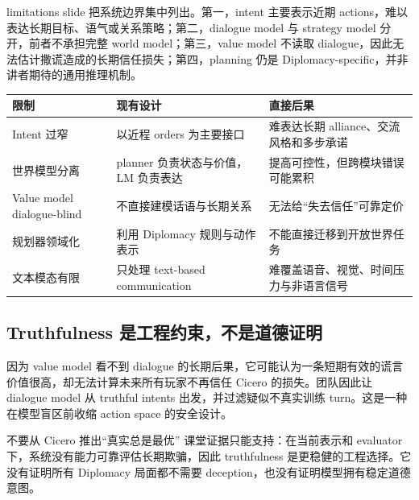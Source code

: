 limitations slide 把系统边界集中列出。第一，intent 主要表示近期 actions，难以表达长期目标、语气或关系策略；第二，dialogue model 与 strategy model 分开，前者不承担完整 world model；第三，value model 不读取 dialogue，因此无法估计撒谎造成的长期信任损失；第四，planning 仍是 Diplomacy-specific，并非讲者期待的通用推理机制。


\begin{longtable}{L{0.22\textwidth}L{0.31\textwidth}L{0.37\textwidth}}
\toprule
限制 & 现有设计 & 直接后果 \\
\midrule
Intent 过窄 & 以近程 orders 为主要接口 & 难表达长期 alliance、交流风格和多步承诺 \\
世界模型分离 & planner 负责状态与价值，LM 负责表达 & 提高可控性，但跨模块错误可能累积 \\
Value model dialogue-blind & 不直接建模话语与长期关系 & 无法给“失去信任”可靠定价 \\
规划器领域化 & 利用 Diplomacy 规则与动作表示 & 不能直接迁移到开放世界任务 \\
文本模态有限 & 只处理 text-based communication & 难覆盖语音、视觉、时间压力与非语言信号 \\
\bottomrule
\end{longtable}

\subsection{Truthfulness 是工程约束，不是道德证明}

因为 value model 看不到 dialogue 的长期后果，它可能认为一条短期有效的谎言价值很高，却无法计算未来所有玩家不再信任 Cicero 的损失。团队因此让 dialogue model 从 truthful intents 出发，并过滤疑似不真实训练 turn。这是一种在模型盲区前收缩 action space 的安全设计。

\begin{warningbox}{不要从 Cicero 推出“真实总是最优”}
课堂证据只能支持：在当前表示和 evaluator 下，系统没有能力可靠评估长期欺骗，因此 truthfulness 是更稳健的工程选择。它没有证明所有 Diplomacy 局面都不需要 deception，也没有证明模型拥有稳定道德意图。
\end{warningbox}


